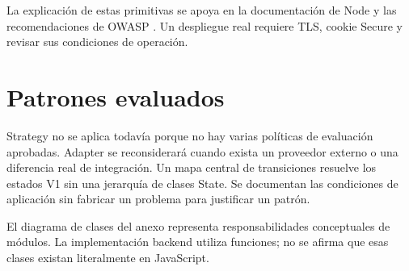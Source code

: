 La explicación de estas primitivas se apoya en la documentación de Node \cite{nodecrypto} y las recomendaciones de OWASP \cite{owaspcsrf}. Un despliegue real requiere TLS, cookie Secure y revisar sus condiciones de operación.

\section{Patrones evaluados}
Strategy no se aplica todavía porque no hay varias políticas de evaluación aprobadas. Adapter se reconsiderará cuando exista un proveedor externo o una diferencia real de integración. Un mapa central de transiciones resuelve los estados V1 sin una jerarquía de clases State. Se documentan las condiciones de aplicación sin fabricar un problema para justificar un patrón.

El diagrama de clases del anexo representa responsabilidades conceptuales de módulos. La implementación backend utiliza funciones; no se afirma que esas clases existan literalmente en JavaScript.
